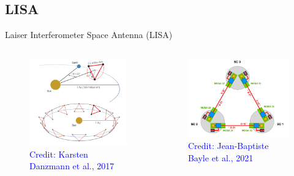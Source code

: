 \documentclass[pdf]{beamer}
\newcommand{\credit}[1]{\tiny{\textcolor{blue}{Credit: #1}}}
\begin{document}
\subsection{LISA}
\begin{frame}{Laiser Interferometer Space Antenna (LISA)}
\begin{columns}

\begin{figure}
\includegraphics[scale=.15]{fig/LISA.png}
\caption*{\credit{Karsten Danzmann et al., 2017}}
\end{figure}

\begin{figure}
\includegraphics[scale=.12]{fig/LISAsch.png}
\caption*{\credit{Jean-Baptiste Bayle et al., 2021}}
\end{figure}

\end{columns}
\end{frame}
\end{document}
